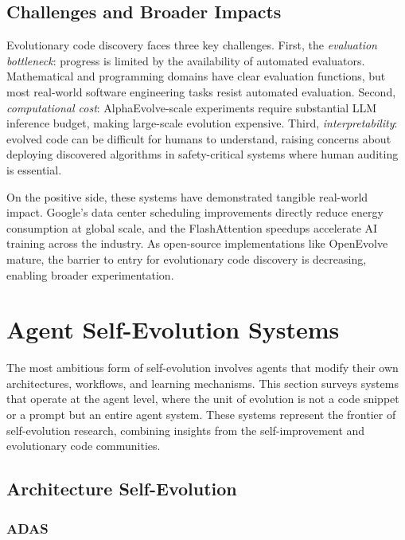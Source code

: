 \documentclass[11pt,a4paper]{article}
\begin{document}
\subsection{Challenges and Broader Impacts}

Evolutionary code discovery faces three key challenges. First, the \emph{evaluation bottleneck}: progress is limited by the availability of automated evaluators. Mathematical and programming domains have clear evaluation functions, but most real-world software engineering tasks resist automated evaluation. Second, \emph{computational cost}: AlphaEvolve-scale experiments require substantial LLM inference budget, making large-scale evolution expensive. Third, \emph{interpretability}: evolved code can be difficult for humans to understand, raising concerns about deploying discovered algorithms in safety-critical systems where human auditing is essential.

On the positive side, these systems have demonstrated tangible real-world impact. Google's data center scheduling improvements directly reduce energy consumption at global scale, and the FlashAttention speedups accelerate AI training across the industry. As open-source implementations like OpenEvolve mature, the barrier to entry for evolutionary code discovery is decreasing, enabling broader experimentation.

\section{Agent Self-Evolution Systems}
\label{sec:agent-evolution}

The most ambitious form of self-evolution involves agents that modify their own architectures, workflows, and learning mechanisms. This section surveys systems that operate at the agent level, where the unit of evolution is not a code snippet or a prompt but an entire agent system. These systems represent the frontier of self-evolution research, combining insights from the self-improvement and evolutionary code communities.

\subsection{Architecture Self-Evolution}

\subsubsection{ADAS}
\end{document}
